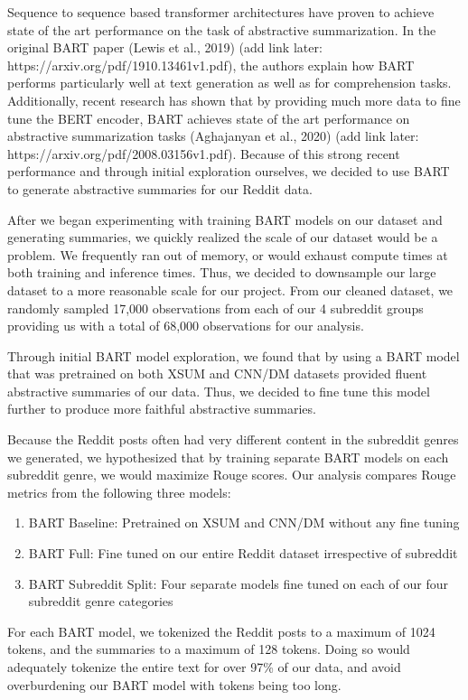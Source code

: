 \documentclass[11pt,a4paper, twocolumn]{article}
\begin{document}
Sequence to sequence based transformer architectures have proven to achieve state of the art performance on the task of abstractive summarization.
In the original BART paper  (Lewis et al., 2019) (add link later: https://arxiv.org/pdf/1910.13461v1.pdf), the authors explain how BART performs 
particularly well at text generation as well as for comprehension tasks. Additionally, recent research has shown that by providing 
much more data to fine tune the BERT encoder, BART achieves state of the art performance on abstractive summarization tasks (Aghajanyan et al., 2020) (add link later: https://arxiv.org/pdf/2008.03156v1.pdf). 
Because of this strong recent performance and through initial exploration ourselves, we decided to use BART to 
generate abstractive summaries for our Reddit data. 

After we began experimenting with training BART models on our dataset and generating summaries, we quickly realized the scale of our dataset would be a problem. 
We frequently ran out of memory, or would exhaust compute times at both training and inference times. 
Thus, we decided to downsample our large dataset to a more reasonable scale for our project. 
From our cleaned dataset, we randomly sampled 17,000 observations from each of our 4 subreddit groups providing us with a total of 68,000 observations for our analysis. 

Through initial BART model exploration, we found that by using a BART model that was pretrained on both XSUM and CNN/DM datasets 
provided fluent abstractive summaries of our data. Thus, we decided to fine tune this model further to produce more faithful 
abstractive summaries. 

Because the Reddit posts often had very different content in the subreddit genres we generated, we hypothesized that by training 
separate BART models on each subreddit genre, we would maximize Rouge scores. Our analysis compares Rouge metrics from the following three models:

\begin{enumerate}
  \item BART Baseline: Pretrained on XSUM and CNN/DM without any fine tuning
  \item BART Full: Fine tuned on our entire Reddit dataset irrespective of subreddit
  \item BART Subreddit Split: Four separate models fine tuned on each of our four subreddit genre categories
\end{enumerate}

For each BART model, we tokenized the Reddit posts to a maximum of 1024 tokens, and the summaries to a maximum of 128 tokens. 
Doing so would adequately tokenize the entire text for over 97\% of our data, and avoid overburdening our BART model with tokens being too long. 
\end{document}
